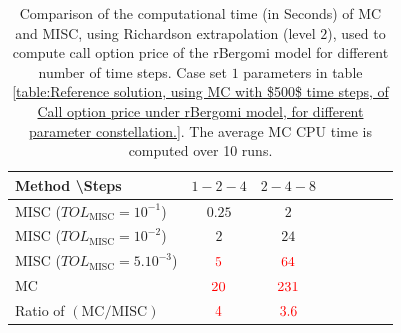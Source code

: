 \begin{table}[!h]
	\centering
	\begin{tabular}{l*{6}{c}r}
		Method \textbackslash  Steps            & $1-2-4$ & $2-4-8$   \\
		\hline
		MISC ($TOL_{\text{MISC}}=10^{-1}$)  & $0.25$ & $2$ &   \\
		MISC ($TOL_{\text{MISC}}=10^{-2}$)  & $2$ & $24$   \\
		MISC ($TOL_{\text{MISC}}=5.10^{-3}$)  & ${\color{red}5}$ & ${\color{red}64}$  \\	
		\hline
		MC    & ${\color{red}20}$  & ${\color{red}231}$  \\
		
		\hline
		Ratio of $\left(\text{MC}/ \text{MISC} \right)$  &${\color{red}4}$ & ${\color{red}  3.6}$   \\
		\hline
	\end{tabular}
	\caption{Comparison of the computational time (in Seconds) of  MC and MISC, using Richardson extrapolation (level $2$), used to compute call option price of the rBergomi model for different number of time steps. Case set $1$ parameters in table \ref{table:Reference solution, using MC with $500$ time steps, of Call option price under rBergomi model, for different parameter constellation.}. The
		average MC CPU time is computed over 10 runs.}
	\label{Comparsion of the computational time of  MC and MISC, using Richardson extrapolation (level $2$), used to compute Call option price of rBergomi model for different number of time steps. Case set $1$ parameters}
\end{table}











